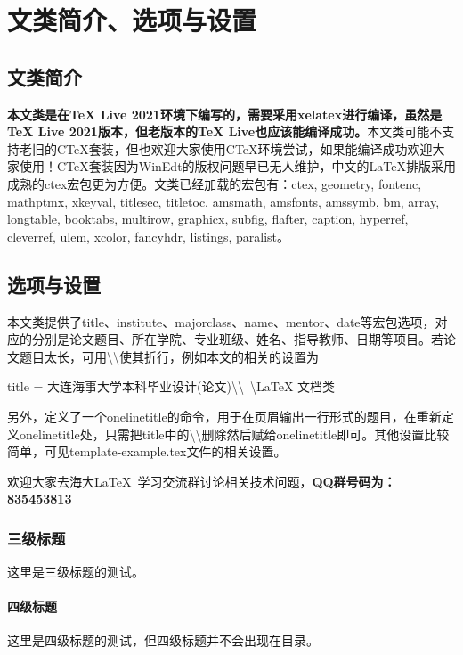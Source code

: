 \centerline{\bf{}\onelinetitle}
\section{文类简介、选项与设置}
\subsection{文类简介}
\textbf{本文类是在TeX Live 2021环境下编写的，需要采用xelatex进行编译，虽然是TeX Live 2021版本，但老版本的TeX Live也应该能编译成功。}本文类可能不支持老旧的CTeX套装，但也欢迎大家使用CTeX环境尝试，如果能编译成功欢迎大家使用！CTeX套装因为WinEdt的版权问题早已无人维护，中文的LaTeX排版采用成熟的ctex宏包更为方便。文类已经加载的宏包有：ctex, geometry, fontenc, mathptmx, xkeyval, titlesec, titletoc, amsmath, amsfonts, amssymb, bm, array, longtable, booktabs, multirow, graphicx, subfig, flafter, caption, hyperref, cleverref, ulem, xcolor, fancyhdr, listings, paralist。
\subsection{选项与设置}
本文类提供了title、institute、majorclass、name、mentor、date等宏包选项，对应的分别是论文题目、所在学院、专业班级、姓名、指导教师、日期等项目。若论文题目太长，可用\textbackslash\textbackslash 使其折行，例如本文的相关的设置为

\centerline{title = 大连海事大学本科毕业设计(论文)\textbackslash\textbackslash\ \textbackslash LaTeX 文档类}

另外，定义了一个onelinetitle的命令，用于在页眉输出一行形式的题目，在重新定义onelinetitle处，只需把title中的\textbackslash\textbackslash 删除然后赋给onelinetitle即可。其他设置比较简单，可见template-example.tex文件的相关设置。

欢迎大家去海大\LaTeX\ 学习交流群讨论相关技术问题，\textbf{QQ群号码为：835453813}
\subsubsection{三级标题}
这里是三级标题的测试。
\paragraph{四级标题}
这里是四级标题的测试，但四级标题并不会出现在目录。
